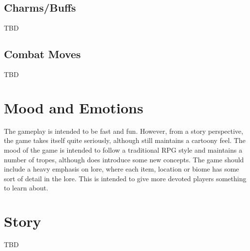 \documentclass[a4paper]{scrreprt}
\begin{document}
\subsection{Charms/Buffs}
TBD

\subsection{Combat Moves}
TBD

\section{Mood and Emotions}
The gameplay is intended to be fast and fun.
However, from a story perspective, the game takes itself quite seriously, although still maintains a cartoony feel.
The mood of the game is intended to follow a traditional RPG style and maintains a number of tropes, although does introduce some new concepts.
The game should include a heavy emphasis on lore, where each item, location or biome has some sort of detail in the lore.
This is intended to give more devoted players something to learn about.

\section{Story}
TBD

%
%
%
%
%
%
\end{document}
